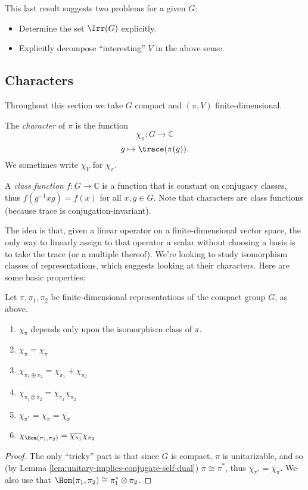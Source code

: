 \documentclass[reqno]{amsart} 
\begin{document}
This last result suggests two problems for a given $G$:
\begin{itemize}
\item Determine the set $\Irr(G)$ explicitly.
\item Explicitly decompose ``interesting'' $V$ in the above sense.
\end{itemize}

\subsection{Characters}
Throughout this section we take $G$ compact and $(\pi,V)$ finite-dimensional.
\begin{definition}
  The \emph{character} of $\pi$ is the function
  \begin{equation*}
    \chi_\pi : G \rightarrow \mathbb{C}
  \end{equation*}
  \begin{equation*}
    g \mapsto \trace(\pi(g)).
  \end{equation*}
  We sometimes write $\chi_V$ for $\chi_\pi$.
  
  A \emph{class function} $f : G \rightarrow \mathbb{C}$ is a function that is constant on conjugacy classes, thus $f(g^{-1} x g) = f(x)$ for all $x,g \in G$.  Note that characters are class functions (because trace is conjugation-invariant).
\end{definition}
The idea is that, given a linear operator on a finite-dimensional vector space, the only way to linearly assign to that operator a scalar without choosing a basis is to take the trace (or a multiple thereof).  We're looking to study isomorphism classes of representations, which suggests looking at their characters.  Here are some basic properties:
\begin{lemma}\label{lem:characters-basic}
  Let $\pi, \pi_1, \pi_2$ be finite-dimensional representations of the compact group $G$, as above.
  \begin{enumerate}
  \item $\chi_{\pi}$ depends only upon the isomorphism class of $\pi$.
  \item $\chi_{\overline{\pi }} = \overline{\chi_\pi}$
  \item $\chi_{\pi_1 \oplus \pi_2}= \chi_{\pi_1} + \chi_{\pi_2}$
  \item $\chi_{\pi_1 \otimes \pi_2}= \chi_{\pi_1} \chi_{\pi_2}$
  \item $\chi_{\pi^*} = \chi_{\overline{\pi }} = \overline{\chi_\pi }$
  \item $\chi_{\Hom(\pi_1,\pi_2)} = \overline{\chi_{\pi_1}} \chi_{\pi_2}$
  \end{enumerate}
\end{lemma}
\begin{proof}
  The only ``tricky'' part is that since $G$ is compact, $\pi$ is unitarizable, and so (by Lemma \ref{lem:unitary-implies-conjugate-self-dual}) $\overline{\pi } \cong \pi^*$, thus $\chi_{\pi^*} = \chi_{\overline{\pi }}$.  We also use that $\Hom(\pi_1,\pi_2) \cong \pi_1^* \otimes \pi_2$.
\end{proof}
\end{document}
